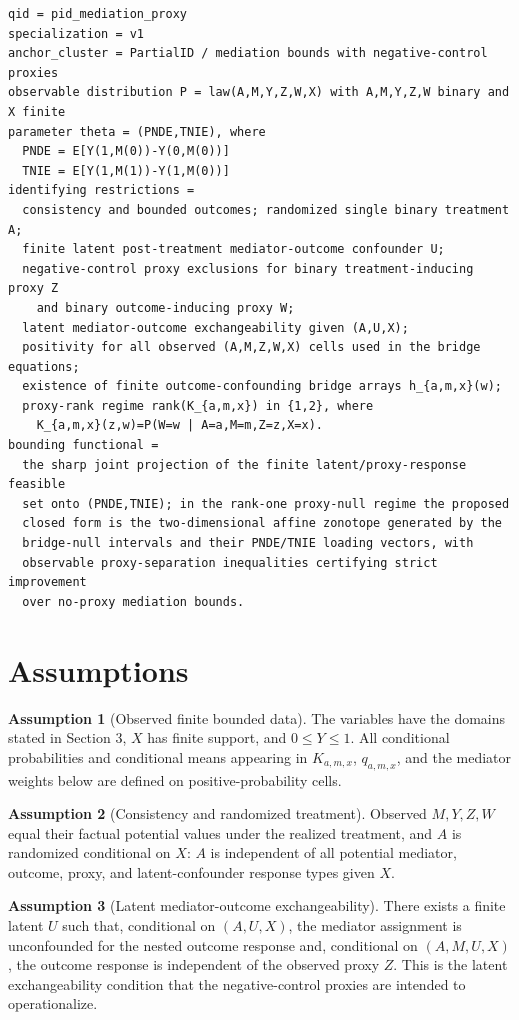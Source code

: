 \documentclass[11pt]{article}
\theoremstyle{definition}
\newtheorem{assumption}{Assumption}
\theoremstyle{plain}
\theoremstyle{remark}
\begin{document}
\begin{verbatim}
qid = pid_mediation_proxy
specialization = v1
anchor_cluster = PartialID / mediation bounds with negative-control proxies
observable distribution P = law(A,M,Y,Z,W,X) with A,M,Y,Z,W binary and X finite
parameter theta = (PNDE,TNIE), where
  PNDE = E[Y(1,M(0))-Y(0,M(0))]
  TNIE = E[Y(1,M(1))-Y(1,M(0))]
identifying restrictions =
  consistency and bounded outcomes; randomized single binary treatment A;
  finite latent post-treatment mediator-outcome confounder U;
  negative-control proxy exclusions for binary treatment-inducing proxy Z
    and binary outcome-inducing proxy W;
  latent mediator-outcome exchangeability given (A,U,X);
  positivity for all observed (A,M,Z,W,X) cells used in the bridge equations;
  existence of finite outcome-confounding bridge arrays h_{a,m,x}(w);
  proxy-rank regime rank(K_{a,m,x}) in {1,2}, where
    K_{a,m,x}(z,w)=P(W=w | A=a,M=m,Z=z,X=x).
bounding functional =
  the sharp joint projection of the finite latent/proxy-response feasible
  set onto (PNDE,TNIE); in the rank-one proxy-null regime the proposed
  closed form is the two-dimensional affine zonotope generated by the
  bridge-null intervals and their PNDE/TNIE loading vectors, with
  observable proxy-separation inequalities certifying strict improvement
  over no-proxy mediation bounds.
\end{verbatim}

\section{Assumptions}
\begin{assumption}[Observed finite bounded data]\label{ass:data}
The variables have the domains stated in Section 3, \(X\) has finite support, and \(0\le Y\le1\).  All conditional probabilities and conditional means appearing in \(K_{a,m,x}\), \(q_{a,m,x}\), and the mediator weights below are defined on positive-probability cells.
\end{assumption}

\begin{assumption}[Consistency and randomized treatment]\label{ass:consistency}
Observed \(M,Y,Z,W\) equal their factual potential values under the realized treatment, and \(A\) is randomized conditional on \(X\): \(A\) is independent of all potential mediator, outcome, proxy, and latent-confounder response types given \(X\).
\end{assumption}

\begin{assumption}[Latent mediator-outcome exchangeability]\label{ass:latent-exchange}
There exists a finite latent \(U\) such that, conditional on \((A,U,X)\), the mediator assignment is unconfounded for the nested outcome response and, conditional on \((A,M,U,X)\), the outcome response is independent of the observed proxy \(Z\).  This is the latent exchangeability condition that the negative-control proxies are intended to operationalize.
\end{assumption}
\end{document}
